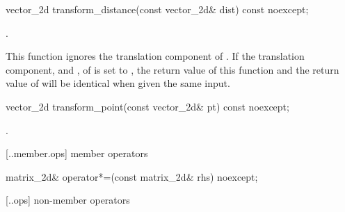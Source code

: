 \begin{itemdecl}
vector_2d transform_distance(const vector_2d& dist) const noexcept;
\end{itemdecl}
\begin{itemdescr}
	\pnum
	\returns
	.
	
	\pnum
	\realnote
	This function ignores the translation component of . If the 
	translation component,  and , of  is set to , the return value of this function and the return 
	value of  will be identical when given the 
	same input.
\end{itemdescr}

\begin{itemdecl}
vector_2d transform_point(const vector_2d& pt) const noexcept;
\end{itemdecl}
\begin{itemdescr}
	\pnum
	\returns
	.
\end{itemdescr}

 [\iotwod.\matrixtwod.member.ops] { member operators}

\begin{itemdecl}
	matrix_2d& operator*=(const matrix_2d& rhs) noexcept;
\end{itemdecl}
\begin{itemdescr}
	\pnum
	\effects
	
	\pnum
	\returns
\end{itemdescr}

 [\iotwod.\matrixtwod.ops] { non-member operators}

